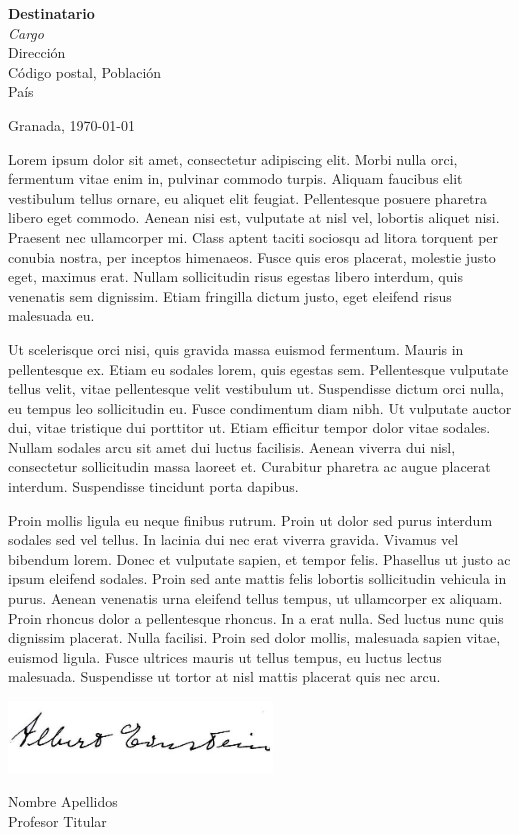 \documentclass{UGR-generico}
\newcommand{\miNombre}{Nombre Apellidos\xspace}
\newcommand{\miCargo}{Profesor Titular\xspace}
\newcommand{\desNombre}{Destinatario\xspace}
\newcommand{\desCargo}{Cargo\xspace}
\newcommand{\desDireccion}{Dirección\xspace}
\newcommand{\desCP}{Código postal\xspace}
\newcommand{\desPoblacion}{Población\xspace}
\newcommand{\desPais}{País\xspace}
\begin{document}
\thispagestyle{scrheadings}

\hfill\vfill
\textbf{\desNombre}\\
\textit{\desCargo}\\
\desDireccion \\
\desCP, \desPoblacion \\
\desPais
\vfill

Granada, \today
\medskip

Lorem ipsum dolor sit amet, consectetur adipiscing elit. Morbi nulla orci, fermentum vitae enim in, pulvinar commodo turpis. Aliquam faucibus elit vestibulum tellus ornare, eu aliquet elit feugiat. Pellentesque posuere pharetra libero eget commodo. Aenean nisi est, vulputate at nisl vel, lobortis aliquet nisi. Praesent nec ullamcorper mi. Class aptent taciti sociosqu ad litora torquent per conubia nostra, per inceptos himenaeos. Fusce quis eros placerat, molestie justo eget, maximus erat. Nullam sollicitudin risus egestas libero interdum, quis venenatis sem dignissim. Etiam fringilla dictum justo, eget eleifend risus malesuada eu.

Ut scelerisque orci nisi, quis gravida massa euismod fermentum. Mauris in pellentesque ex. Etiam eu sodales lorem, quis egestas sem. Pellentesque vulputate tellus velit, vitae pellentesque velit vestibulum ut. Suspendisse dictum orci nulla, eu tempus leo sollicitudin eu. Fusce condimentum diam nibh. Ut vulputate auctor dui, vitae tristique dui porttitor ut. Etiam efficitur tempor dolor vitae sodales. Nullam sodales arcu sit amet dui luctus facilisis. Aenean viverra dui nisl, consectetur sollicitudin massa laoreet et. Curabitur pharetra ac augue placerat interdum. Suspendisse tincidunt porta dapibus.

Proin mollis ligula eu neque finibus rutrum. Proin ut dolor sed purus interdum sodales sed vel tellus. In lacinia dui nec erat viverra gravida. Vivamus vel bibendum lorem. Donec et vulputate sapien, et tempor felis. Phasellus ut justo ac ipsum eleifend sodales. Proin sed ante mattis felis lobortis sollicitudin vehicula in purus. Aenean venenatis urna eleifend tellus tempus, ut ullamcorper ex aliquam. Proin rhoncus dolor a pellentesque rhoncus. In a erat nulla. Sed luctus nunc quis dignissim placerat. Nulla facilisi. Proin sed dolor mollis, malesuada sapien vitae, euismod ligula. Fusce ultrices mauris ut tellus tempus, eu luctus lectus malesuada. Suspendisse ut tortor at nisl mattis placerat quis nec arcu. 

\vfill\vfill
\begin{center}

  \includegraphics[width=7cm]{img/firma}

  \begin{bfseries}
  \miNombre\\\smallskip
  \miCargo
  \end{bfseries}
\end{center}
\vfill



%
\end{document}
